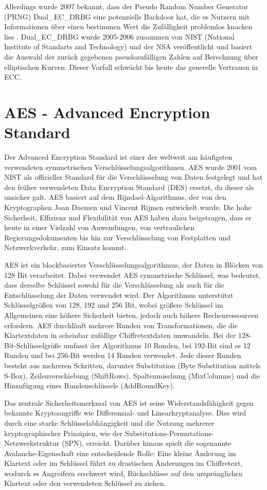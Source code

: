 \documentclass{scrreprt}
\begin{document}
Allerdings wurde 2007 bekannt, dass der Pseudo Random Number Generator (PRNG) Dual\_EC\_DRBG eine potenzielle Backdoor hat, die es Nutzern mit Informationen über einen bestimmen Wert die Zufälligkeit problemlos knacken lies \cite{ecc-green2013backdoor}. Dual\_EC\_DRBG wurde 2005-2006 zusammen von NIST (National Institute of Standarts and Technology) und der NSA veröffentlicht und basiert die Auswahl der zurück gegebenen pseudozufälligen Zahlen auf Berechnung über elliptischen Kurven. Dieser Vorfall schwächt bis heute das generelle Vertrauen in ECC. \cite{ecc-cloud2013elliptic}

\section{AES - Advanced Encryption Standard}
\label{sec:aes}
Der Advanced Encryption Standard ist einer der weltweit am häufigsten verwendeten symmetrischen Verschlüsselungsalgorithmen. AES wurde 2001 vom NIST als offizieller Standard für die Verschlüsselung von Daten festgelegt und hat den früher verwendeten Data Encryption Standard (DES) ersetzt, da dieser als unsicher galt. AES basiert auf dem Rijndael-Algorithmus, der von den Kryptographen Joan Daemen und Vincent Rijmen entwickelt wurde. Die hohe Sicherheit, Effizienz und Flexibilität von AES haben dazu beigetragen, dass er heute in einer Vielzahl von Anwendungen, von vertraulichen Regierungsdokumenten bis hin zur Verschlüsselung von Festplatten und Netzwerkverkehr, zum Einsatz kommt.

AES ist ein blockbasierter Verschlüsselungsalgorithmus, der Daten in Blöcken von 128 Bit verarbeitet. Dabei verwendet AES symmetrische Schlüssel, was bedeutet, dass derselbe Schlüssel sowohl für die Verschlüsselung als auch für die Entschlüsselung der Daten verwendet wird. Der Algorithmus unterstützt Schlüsselgrößen von 128, 192 und 256 Bit, wobei größere Schlüssel im Allgemeinen eine höhere Sicherheit bieten, jedoch auch höhere Rechenressourcen erfordern. AES durchläuft mehrere Runden von Transformationen, die die Klartextdaten in scheinbar zufällige Chiffretextdaten umwandeln. Bei der 128-Bit-Schlüsselgröße umfasst der Algorithmus 10 Runden, bei 192-Bit sind es 12 Runden und bei 256-Bit werden 14 Runden verwendet. Jede dieser Runden besteht aus mehreren Schritten, darunter Substitution (Byte Substitution mittels S-Box), Zeilenverschiebung (ShiftRows), Spaltenmischung (MixColumns) und die Hinzufügung eines Rundenschlüssels (AddRoundKey).

Das zentrale Sicherheitsmerkmal von AES ist seine Widerstandsfähigkeit gegen bekannte Kryptoangriffe wie Differenzial- und Linearkryptanalyse. Dies wird durch eine starke Schlüsselabhängigkeit und die Nutzung mehrerer kryptographischer Prinzipien, wie der Substitutions-Permutations-Netzwerkstruktur (SPN), erreicht. Darüber hinaus spielt die sogenannte Avalanche-Eigenschaft eine entscheidende Rolle: Eine kleine Änderung im Klartext oder im Schlüssel führt zu drastischen Änderungen im Chiffretext, wodurch es Angreifern erschwert wird, Rückschlüsse auf den ursprünglichen Klartext oder den verwendeten Schlüssel zu ziehen.\\
\end{document}
